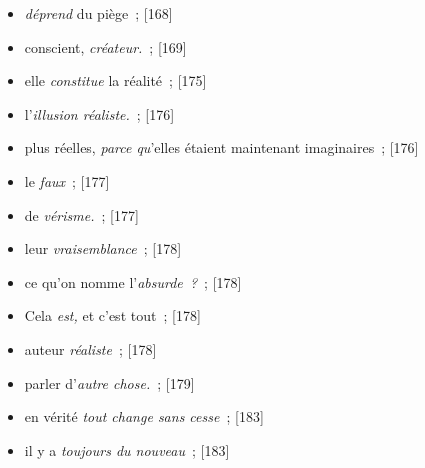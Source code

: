 \documentclass[12pt, a4paper]{article}
\begin{document}
\begin{itemize}
	\item \textit{déprend} du piège{\color{gray}~; [168]}

	\item conscient, \textit{créateur.}{\color{gray}~; [169]}

	\item elle \textit{constitue} la réalité{\color{gray}~; [175]}

	\item l’\textit{illusion réaliste.}{\color{gray}~; [176]}

	\item plus réelles, \textit{parce qu}’elles étaient maintenant imaginaires{\color{gray}~; [176]}

	\item le \textit{faux}{\color{gray}~; [177]}

	\item de \textit{vérisme.}{\color{gray}~; [177]}

	\item leur \textit{vraisemblance}{\color{gray}~; [178]}

	\item ce qu’on nomme l’\textit{absurde~?}{\color{gray}~; [178]}

	\item Cela \textit{est,} et c’est tout{\color{gray}~; [178]}

	\item auteur \textit{réaliste}{\color{gray}~; [178]}

	\item parler d’\textit{autre chose.}{\color{gray}~; [179]}

	\item en vérité \textit{tout change sans cesse}{\color{gray}~; [183]}

	\item il y a \textit{toujours du nouveau}{\color{gray}~; [183]}
\end{itemize}
\newpage
\tableofcontents
\end{document}
